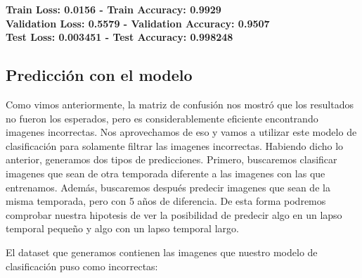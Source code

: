 \documentclass{article}
\begin{document}
        \begin{center}

                \textbf{Train Loss:  0.0156 - Train Accuracy:  0.9929} \\

                \textbf{Validation Loss:  0.5579 - Validation Accuracy:  0.9507} \\

                \textbf{Test Loss:  0.003451 - Test Accuracy:  0.998248} \\

        \end{center}

    \subsection{Predicción con el modelo }

        Como vimos anteriormente, la matriz de confusión nos mostró que los resultados no fueron los esperados, pero es considerablemente eficiente encontrando imagenes incorrectas. Nos aprovechamos de eso y vamos a utilizar este modelo de clasificación para solamente filtrar las imagenes incorrectas. Habiendo dicho lo anterior, generamos dos tipos de predicciones. Primero, buscaremos clasificar imagenes que sean de otra temporada diferente a las imagenes con las que entrenamos. Además, buscaremos después predecir imagenes que sean de la misma temporada, pero con 5 años de diferencia. De esta forma podremos comprobar nuestra hipotesis de ver la posibilidad de predecir algo en un lapso temporal pequeño y algo con un lapso temporal largo.

        El dataset que generamos contienen las imagenes que nuestro modelo de clasificación puso como incorrectas:
\end{document}
